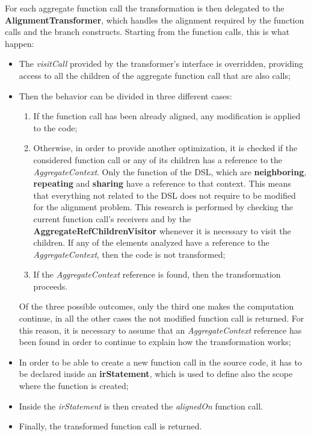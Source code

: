 For each aggregate function call the transformation is then delegated to the \textbf{AlignmentTransformer}, which handles the alignment required by the function calls and the branch constructs.\newline
Starting from the function calls, this is what happen:
\begin{itemize}
    \item The \textit{visitCall} provided by the transformer's interface is overridden, providing access to all the children of the aggregate function call that are also calls;
    \item Then the behavior can be divided in three different cases:
    \begin{enumerate}
        \item If the function call has been already aligned, any modification is applied to the code;
        \item Otherwise, in order to provide another optimization, it is checked if the considered function call or any of its children has a reference to the \textit{AggregateContext}. Only the function of the DSL, which are \textbf{neighboring}, \textbf{repeating} and \textbf{sharing} have a reference to that context. This means that everything not related to the DSL does not require to be modified for the alignment problem. This research is performed by checking the current function call's receivers and by the \textbf{AggregateRefChildrenVisitor} whenever it is necessary to visit the children.\newline
        If any of the elements analyzed have a reference to the \textit{AggregateContext}, then the code is not transformed;
        \item If the \textit{AggregateContext} reference is found, then the transformation proceeds. 
    \end{enumerate}
    Of the three possible outcomes, only the third one makes the computation continue, in all the other cases the not modified function call is returned. For this reason, it is necessary to assume that an \textit{AggregateContext} reference has been found in order to continue to explain how the transformation works;
    \item In order to be able to create a new function call in the source code, it has to be declared inside an \textbf{irStatement}, which is used to define also the scope where the function is created;
    \item Inside the \textit{irStatement} is then created the \textit{alignedOn} function call.
    \item Finally, the transformed function call is returned.
\end{itemize}

